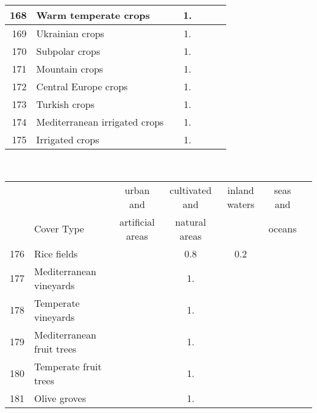 {{\begin{tabular}{||r|l||c|c|c|c|c||}
 \hline
         168  & Warm temperate crops                                         &       &  1.   &       &       \\
 \hline
         169  & Ukrainian crops                                              &       &  1.   &       &       \\
 \hline
         170  & Subpolar crops                                               &       &  1.   &       &       \\
 \hline
         171  & Mountain crops                                               &       &  1.   &       &       \\
 \hline
         172  & Central Europe crops                                         &       &  1.   &       &       \\
 \hline
         173  & Turkish crops                                                &       &  1.   &       &       \\
 \hline
 \hline
         174  & Mediterranean irrigated crops                                &       &  1.   &       &       \\
 \hline
         175  & Irrigated crops                                              &       &  1.   &       &       \\
 \hline
 \end{tabular}
 \clearpage
 \medskip\
 \begin{tabular}{||r|l||c|c|c|c|c||}
 \hline
 \hline
 && urban and & cultivated and &inland waters&seas and\\
 &Cover Type& artificial areas & natural areas&&oceans\\
 \hline
 \hline
         176  & Rice fields                                                  &       &  0.8  &  0.2  &       \\
 \hline
 \hline
         177  & Mediterranean vineyards                                      &       &  1.   &       &       \\
 \hline
         178  & Temperate vineyards                                          &       &  1.   &       &       \\
 \hline
         179  & Mediterranean fruit trees                                    &       &  1.   &       &       \\
 \hline
         180  & Temperate fruit trees                                        &       &  1.   &       &       \\
 \hline
         181  & Olive groves                                                 &       &  1.   &       &       \\

\end{tabular}}}
